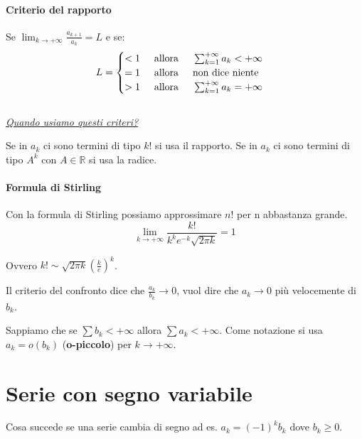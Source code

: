 \subsubsection{Criterio del rapporto}

Se $\lim_{k\to+\infty}\frac{a_{k+1}}{a_k}=L$ e se:
$$L=
\begin{cases}
    <1\hspace{0.5cm}\text{allora}\hspace{0.5cm}\sum^{+\infty}_{k=1}a_k<+\infty\\
    =1\hspace{0.5cm}\text{allora}\hspace{0.5cm}\text{non dice niente}\\
    >1\hspace{0.5cm}\text{allora}\hspace{0.5cm}\sum^{+\infty}_{k=1}a_k=+\infty
\end{cases}$$
\phantom{ }\\
\underline{\textit{Quando usiamo questi criteri?}}

Se in $a_k$ ci sono termini di tipo $k!$ si usa il rapporto. Se in $a_k$ ci sono termini di tipo $A^k$ con $A\in\mathbb{R}$ si usa la radice.

\subsubsection{Formula di Stirling}
Con la formula di Stirling possiamo approssimare $n!$ per n abbastanza grande.
\begin{equation*}
    \lim_{k\to+\infty}\frac{k!}{k^ke^{-k}\sqrt{2\pi k}}=1
\end{equation*}

Ovvero $k!\sim\sqrt{2\pi k}(\frac{k}{e})^k$.

\begin{notation*}
Il criterio del confronto dice che $\frac{a_k}{b_k}\to0$, vuol dire che $a_k\to0$ più velocemente di $b_k$.

Sappiamo che se $\sum b_k<+\infty$ allora $\sum a_k<+\infty$. Come notazione si usa $a_k=o(b_k)$ (\textbf{o-piccolo}) per $k\to+\infty$.
\end{notation*}


\chapter{Serie con segno variabile}

Cosa succede se una serie cambia di segno ad es. $a_k=(-1)^kb_k$ dove $b_k\geq0$.

